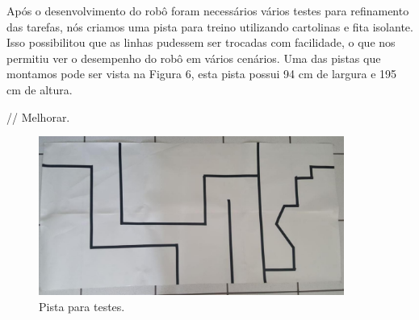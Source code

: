 Após o desenvolvimento do robô foram necessários vários testes para refinamento das tarefas, nós criamos uma pista para treino utilizando cartolinas e fita isolante. Isso possibilitou que as linhas pudessem ser trocadas com facilidade, o que nos permitiu ver o desempenho do robô em vários cenários.  Uma das pistas que montamos pode ser vista na Figura 6, esta pista possui 94 cm de largura e 195 cm de altura.


//  Melhorar.

\begin{figure}[!htb]
	\centering
	\includegraphics[width=10cm]{images/pista.png}
	\caption{Pista para testes.}
	\label{pista}
\end{figure}

\newpage